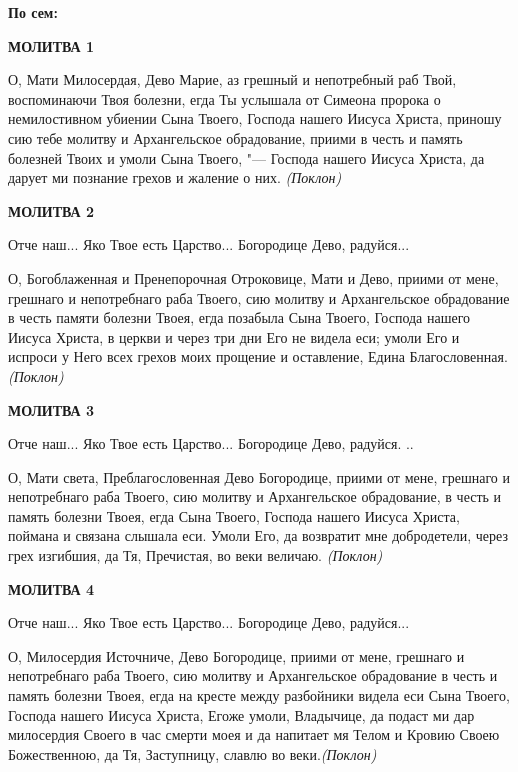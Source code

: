 \bfseries По сем:\normalfont{}\nopagebreak


\medskip


\bfseries МОЛИТВА 1\normalfont{}\nopagebreak


О, Мати Милосердая, Дево Марие, аз грешный и непотребный раб Твой, воспоминаючи Твоя болезни, егда Ты услышала от Симеона пророка о немилостивном убиении Сына Твоего, Господа нашего Иисуса Христа, приношу сию тебе молитву и Архангельское обрадование, приими в честь и память болезней Твоих и умоли Сына Твоего, "--- Господа нашего Иисуса Христа, да дарует ми познание грехов и жаление о них. \itshape (Поклон)\normalfont{}


\medskip


\bfseries МОЛИТВА 2\normalfont{}\nopagebreak


Отче наш... Яко Твое есть Царство... Богородице Дево, радуйся...

О, Богоблаженная и Пренепорочная Отроковице, Мати и Дево, приими от мене, грешнаго и непотребнаго раба Твоего, сию молитву и Архангельское обрадование в честь памяти болезни Твоея, егда позабыла Сына Твоего, Господа нашего Иисуса Христа, в церкви и через три дни Его не видела еси; умоли Его и испроси у Него всех грехов моих прощение и оставление, Едина Благословенная. \itshape (Поклон)\normalfont{}


\medskip


\bfseries МОЛИТВА 3\normalfont{}\nopagebreak


Отче наш... Яко Твое есть Царство... Богородице Дево, радуйся. ..

О, Мати света, Преблагословенная Дево Богородице, приими от мене, грешнаго и непотребнаго раба Твоего, сию молитву и Архангельское обрадование, в честь и память болезни Твоея, егда Сына Твоего, Господа нашего Иисуса Христа, поймана и связана слышала еси. Умоли Его, да возвратит мне добродетели, через грех изгибшия, да Тя, Пречистая, во веки величаю. \itshape (Поклон)\normalfont{}


\medskip


\bfseries МОЛИТВА 4\normalfont{}\nopagebreak


Отче наш... Яко Твое есть Царство... Богородице Дево, радуйся...

О, Милосердия Источниче, Дево Богородице, приими от мене, грешнаго и непотребнаго раба Твоего, сию молитву и Архангельское обрадование в честь и память болезни Твоея, егда на кресте между разбойники видела еси Сына Твоего, Господа нашего Иисуса Христа, Егоже умоли, Владычице, да подаст ми дар милосердия Своего в час смерти моея и да напитает мя Телом и Кровию Своею Божественною, да Тя, Заступницу, славлю во веки.\itshape  (Поклон)\normalfont{}


